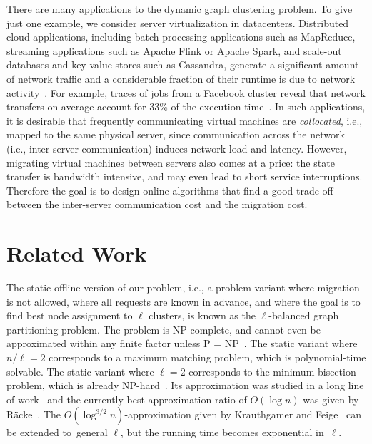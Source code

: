 \documentclass[11pt,a4paper]{scrartcl}
\begin{document}
There are many applications to the dynamic graph clustering problem.
To give just one example, we consider server virtualization in
datacenters. Distributed cloud applications, including batch processing
applications such as MapReduce, streaming applications such as Apache Flink or
Apache Spark, and scale-out databases and key-value stores such as Cassandra,
generate a significant amount of network traffic and a considerable fraction
of their runtime is due to network acti\-vi\-ty~\cite{MogPop12}. For example,
traces of jobs from a Facebook cluster reveal that network transfers on
average account for 33\% of the execution time~\cite{ChZMJS11}. In such
applications, it is desirable that frequently communicating virtual machines
are \emph{collocated}, i.e., mapped to the same physical server, since
communication across the network (i.e., inter-server communication) induces
network load and latency. However, migrating virtual machines between servers
also comes at a price: the state transfer is bandwidth intensive, and may even
lead to short service interruptions. Therefore the goal is to design online
algorithms that find a good trade-off between the inter-server communication
cost and the migration cost.



\section{Related Work}\label{sec:relwork}

The static offline version of our problem, i.e., a problem variant where
migration is not allowed, where all requests are known in advance, and where
the goal is to find best node assignment to $\ell$ clusters, is known as the
$\ell$-balanced graph partitioning problem. The problem is 
NP-complete, and cannot even be approximated within any finite factor unless P
= NP~\cite{AndRae06}. The static variant where $n/\ell = 2$ corresponds to a
maximum matching problem, which is polynomial-time solvable. The static
variant where $\ell = 2$ corresponds to the minimum bisection problem, which
is already NP-hard~\cite{GaJoSt76}. Its approximation was studied in a long
line of work~\cite{SarVaz95,ArKaKa99,FeKrNi00,FeiKra02,KraFei06,Raec08} and
the currently best approximation ratio of $O(\log n)$ was given by
R{\"{a}}cke~\cite{Raec08}. The $O(\log^{3/2} n)$-approximation given by
Krauthgamer and Feige~\cite{KraFei06} can be extended to~general $\ell$, but
the running time becomes exponential in~$\ell$.
\end{document}

